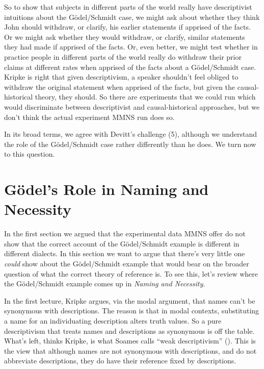 \documentclass[
  10pt,
  letterpaper,
  DIV=11,
  numbers=noendperiod,
  twoside]{scrartcl}
\begin{document}
So to show that subjects in different parts of the world really have
descriptivist intuitions about the Gödel/Schmidt case, we might ask
about whether they think John should withdraw, or clarify, his earlier
statements if apprised of the facts. Or we might ask whether they would
withdraw, or clarify, similar statements they had made if apprised of
the facts. Or, even better, we might test whether in practice people in
different parts of the world really do withdraw their prior claims at
different rates when apprised of the facts about a Gödel/Schmidt case.
Kripke is right that given descriptivism, a speaker shouldn't feel
obliged to withdraw the original statement when apprised of the facts,
but given the causal-historical theory, they should. So there are
experiments that we could run which would discriminate between
descriptivist and causal-historical approaches, but we don't think the
actual experiment MMNS run does so.

In its broad terms, we agree with Devitt's challenge (5), although we
understand the role of the Gödel/Schmidt case rather differently than he
does. We turn now to this question.

\section{Gödel's Role in Naming and
Necessity}\label{guxf6dels-role-in-naming-and-necessity}

In the first section we argued that the experimental data MMNS offer do
not show that the correct account of the Gödel/Schmidt example is
different in different dialects. In this section we want to argue that
there's very little one \emph{could} show about the Gödel/Schmidt
example that would bear on the broader question of what the correct
theory of reference is. To see this, let's review where the
Gödel/Schmidt example comes up in \emph{Naming and Necessity}.

In the first lecture, Kripke argues, via the modal argument, that names
can't be synonymous with descriptions. The reason is that in modal
contexts, substituting a name for an individuating description alters
truth values. So a pure descriptivism that treats names and descriptions
as synonymous is off the table. What's left, thinks Kripke, is what
Soames calls ``weak descriptivism'' (). This is the view that although names are not
synonymous with descriptions, and do not abbreviate descriptions, they
do have their reference fixed by descriptions.
\end{document}
